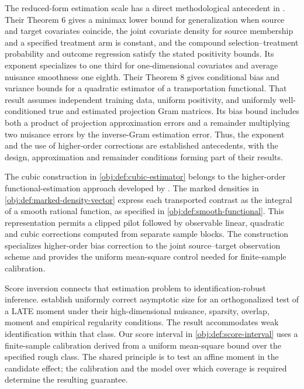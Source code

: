 The reduced-form estimation scale has a direct methodological antecedent in \citet[Theorems 6 and 8]{ZengKennedyBodnarNaimi2025Efficient}. Their Theorem 6 gives a minimax lower bound for generalization when source and target covariates coincide, the joint covariate density for source membership and a specified treatment arm is constant, and the compound selection--treatment probability and outcome regression satisfy the stated positivity bounds. Its exponent specializes to one third for one-dimensional covariates and average nuisance smoothness one eighth. Their Theorem 8 gives conditional bias and variance bounds for a quadratic estimator of a transportation functional. That result assumes independent training data, uniform positivity, and uniformly well-conditioned true and estimated projection Gram matrices. Its bias bound includes both a product of projection approximation errors and a remainder multiplying two nuisance errors by the inverse-Gram estimation error. Thus, the exponent and the use of higher-order corrections are established antecedents, with the design, approximation and remainder conditions forming part of their results.

The cubic construction in \cref{obj:def:cubic-estimator} belongs to the higher-order functional-estimation approach developed by \citet[Section 1]{Robins2008}. The marked densities in \cref{obj:def:marked-density-vector} express each transported contrast as the integral of a smooth rational function, as specified in \cref{obj:def:smooth-functional}. This representation permits a clipped pilot followed by observable linear, quadratic and cubic corrections computed from separate sample blocks. The construction specializes higher-order bias correction to the joint source--target observation scheme and provides the uniform mean-square control needed for finite-sample calibration.

Score inversion connects that estimation problem to identification-robust inference. \citet[Theorem 3.2]{Ma2026IdentificationRobust} establish uniformly correct asymptotic size for an orthogonalized test of a LATE moment under their high-dimensional nuisance, sparsity, overlap, moment and empirical regularity conditions. The result accommodates weak identification within that class. Our score interval in \cref{obj:def:score-interval} uses a finite-sample calibration derived from a uniform mean-square bound over the specified rough class. The shared principle is to test an affine moment in the candidate effect; the calibration and the model over which coverage is required determine the resulting guarantee.

